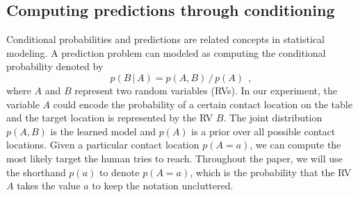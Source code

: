 \subsection{Computing predictions through conditioning}
%
Conditional probabilities and predictions are related concepts in statistical
modeling. A prediction problem can modeled as computing the conditional
probability denoted by 
\begin{equation}
p(B \, | \, A) = p(A,B) \, / \, p(A) ~~, \label{eq:cond_prob}
\end{equation}
where $A$ and
$B$ represent two random variables (RVs). In our experiment, the variable $A$
could encode the probability of a certain contact location on the table and the
target location is represented by the RV $B$. The joint distribution $p(A,B)$ is
the learned model and $p(A)$ is a prior over all possible contact locations.
Given a particular contact location $p(A=a)$, we can compute the most likely 
target the human tries to reach. Throughout the paper, we will use the shorthand
$p(a)$ to denote $p(A=a)$, which is the probability that the RV $A$ takes the
value $a$ to keep the notation uncluttered. 

